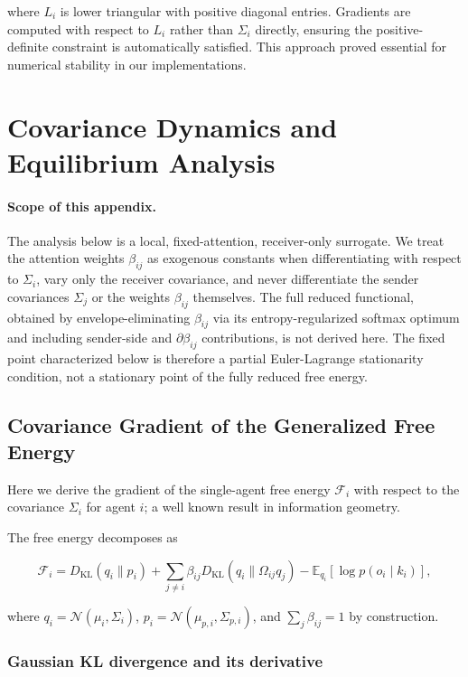 \documentclass[11pt]{article}
\begin{document}
where $L_i$ is lower triangular with positive diagonal entries. Gradients are computed with respect to $L_i$ rather than $\Sigma_i$ directly, ensuring the positive-definite constraint is automatically satisfied. This approach proved essential for numerical stability in our implementations.

\section{Covariance Dynamics and Equilibrium Analysis}
\label{app:covariance_dynamics}

\paragraph{Scope of this appendix.}
The analysis below is a local, fixed-attention, receiver-only surrogate. We treat the attention weights $\beta_{ij}$ as exogenous constants when differentiating with respect to $\Sigma_i$, vary only the receiver covariance, and never differentiate the sender covariances $\Sigma_j$ or the weights $\beta_{ij}$ themselves. The full reduced functional, obtained by envelope-eliminating $\beta_{ij}$ via its entropy-regularized softmax optimum and including sender-side and $\partial \beta_{ij}$ contributions, is not derived here. The fixed point characterized below is therefore a partial Euler-Lagrange stationarity condition, not a stationary point of the fully reduced free energy.

\subsection{Covariance Gradient of the Generalized Free Energy}

Here we derive the gradient of the single-agent free energy $\mathcal{F}_i$ with respect to the covariance $\Sigma_i$ for agent $i$; a well known result in information geometry.

The free energy decomposes as

\begin{equation}
\mathcal{F}_i
=D_{\mathrm{KL}}(q_i \| p_i)
+ \sum_{j \neq i} \beta_{ij}
D_{\mathrm{KL}}(q_i \| \Omega_{ij} q_j)
- \mathbb{E}_{q_i}[\log p(o_i \mid k_i)],
\end{equation}

where $q_i = \mathcal{N}(\mu_i, \Sigma_i)$, $p_i = \mathcal{N}(\mu_{p,i}, \Sigma_{p,i})$, and $\sum_j \beta_{ij} = 1$ by construction.

\subsubsection{Gaussian KL divergence and its derivative}
\end{document}
